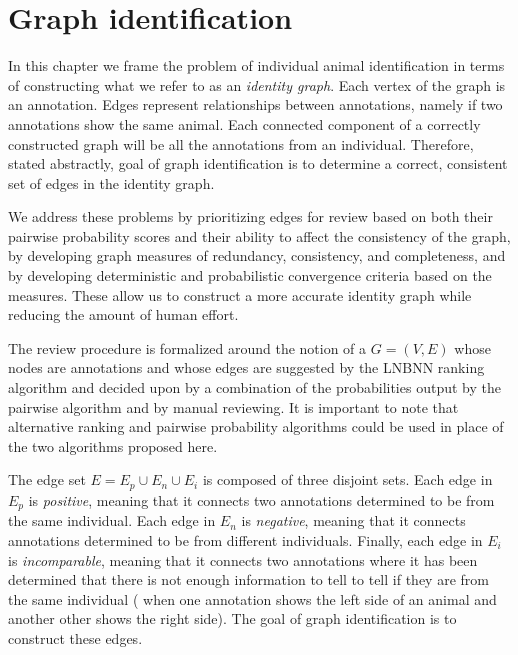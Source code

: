 \chapter{Graph identification}\label{chap:graphid}
\newcommand{\nT}{N}

In this chapter we frame the problem of individual animal identification in
  terms of constructing what we refer to as an \emph{identity graph}.
Each vertex of the graph is an annotation.
Edges represent relationships between annotations, namely if two annotations
  show the same animal.
Each connected component of a correctly constructed graph will be all the
  annotations from an individual.
Therefore, stated abstractly, goal of graph identification is to determine a
  correct, consistent set of edges in the identity graph.


We address these problems by prioritizing edges for review based on both their
  pairwise probability scores and their ability to affect the consistency of the
  graph, by developing graph measures of redundancy, consistency, and
  completeness, and by developing deterministic and probabilistic convergence
  criteria based on the measures.
These allow us to construct a more accurate identity graph while reducing the
  amount of human effort.


The review procedure is formalized around the notion of a %
 $G = (V, E)$ whose nodes are annotations and whose
  edges are suggested by the LNBNN ranking algorithm and decided upon by a
  combination of the probabilities output by the pairwise algorithm and by
  manual reviewing.
It is important to note that alternative ranking and pairwise probability
  algorithms could be used in place of the two algorithms proposed here.


The edge set $E = E_p \cup E_n \cup E_i$ is composed of three disjoint sets.
Each edge in $E_p$ is \emph{positive}, meaning that it connects two
  annotations determined to be from the same individual.
Each edge in $E_n$ is \emph{negative}, meaning that it connects annotations
  determined to be from different individuals.
Finally, each edge in $E_i$ is \emph{incomparable}, meaning that it connects
  two annotations where it has been determined that there is not enough
  information to tell to tell if they are from the same individual (\eg{} when
  one annotation shows the left side of an animal and another other shows the
  right side).
The goal of graph identification is to construct these edges.
  

